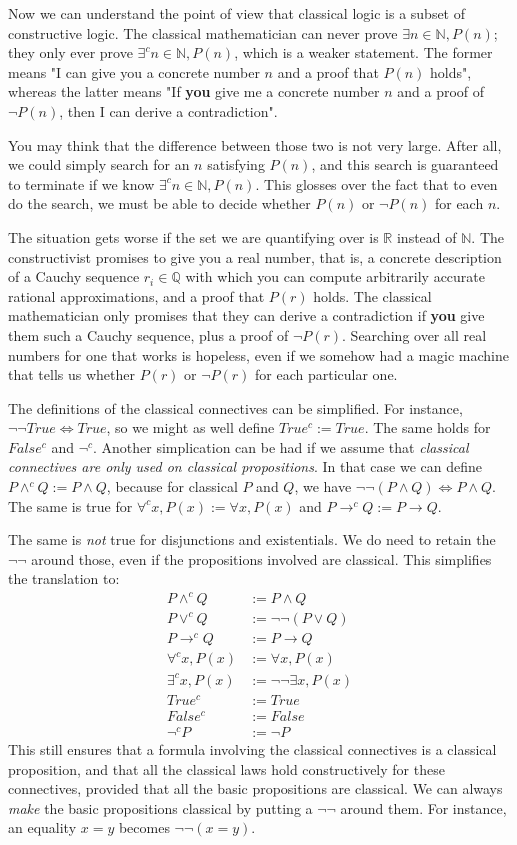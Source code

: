 \documentclass[a4paper, 11pt]{article}
\newcommand{\N}{\mathbb{N}}
\newcommand{\Q}{\mathbb{Q}}
\newcommand{\R}{\mathbb{R}}
\theoremstyle{definition}
\newcommand{\nn}{\neg \neg}
\begin{document}
Now we can understand the point of view that classical logic is a subset of constructive logic. The classical mathematician can never prove $\exists n\in\N, P(n)$; they only ever prove $\exists^c n\in\N, P(n)$, which is a weaker statement. The former means "I can give you a concrete number $n$ and a proof that $P(n)$ holds", whereas the latter means "If \textbf{you} give me a concrete number $n$ and a proof of $\neg P(n)$, then I can derive a contradiction".

You may think that the difference between those two is not very large. After all, we could simply search for an $n$ satisfying $P(n)$, and this search is guaranteed to terminate if we know $\exists^c n\in\N, P(n)$. This glosses over the fact that to even do the search, we must be able to decide whether $P(n)$ or $\neg P(n)$ for each $n$.

The situation gets worse if the set we are quantifying over is $\R$ instead of $\N$. The constructivist promises to give you a real number, that is, a concrete description of a Cauchy sequence $r_i \in \Q$ with which you can compute arbitrarily accurate rational approximations, and a proof that $P(r)$ holds. The classical mathematician only promises that they can derive a contradiction if \textbf{you} give them such a Cauchy sequence, plus a proof of $\neg P(r)$. Searching over all real numbers for one that works is hopeless, even if we somehow had a magic machine that tells us whether $P(r)$ or $\neg P(r)$ for each particular one.

The definitions of the classical connectives can be simplified. For instance, $\nn True \iff True$, so we might as well define $True^c := True$. The same holds for $False^c$ and $\neg^c$. Another simplication can be had if we assume that \emph{classical connectives are only used on classical propositions}. In that case we can define $P \wedge^c Q := P \wedge Q$, because for classical $P$ and $Q$, we have $\nn (P \wedge Q) \iff P \wedge Q$. The same is true for $\forall^c x, P(x) := \forall x, P(x)$ and $P \to^c Q := P \to Q$.

The same is \emph{not} true for disjunctions and existentials. We do need to retain the $\nn$ around those, even if the propositions involved are classical. This simplifies the translation to:
\begin{align*}
  P \wedge^c Q &:= P \wedge Q \\
  P \vee^c Q &:= \nn (P \vee Q) \\
  P \to^c Q &:= P \to Q \\
  \forall^c x, P(x) &:= \forall x, P(x) \\
  \exists^c x, P(x) &:= \nn \exists x, P(x) \\
  True^c &:= True \\
  False^c &:= False \\
  \neg^c P &:= \neg P
\end{align*}
This still ensures that a formula involving the classical connectives is a classical proposition, and that all the classical laws hold constructively for these connectives, provided that all the basic propositions are classical. We can always \emph{make} the basic propositions classical by putting a $\nn$ around them. For instance, an equality $x = y$ becomes $\nn (x = y)$.
\end{document}
